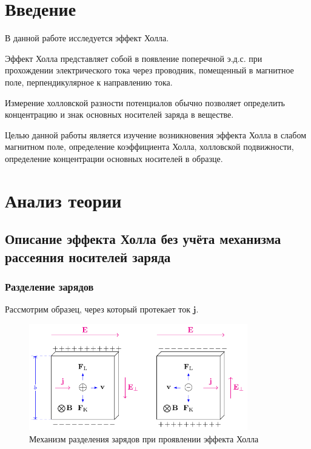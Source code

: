 
\usepackage{colortbl}


\def\labauthors{Понур К.А., Сарафанов Ф.Г., Сидоров Д.А.}
\def\labgroup{420}
\def\labnumber{204}
\def\labtheme{Эффект Холла}
\renewcommand{\vec}{\mathbf}


\tableofcontents
\newpage

\section*{Введение}
\label{sec:input}

В данной работе исследуется эффект Холла.

Эффект Холла представляет собой в появление поперечной э.д.с. при прохождении 
электрического тока через проводник, помещенный в магнитное поле, перпендикулярное к направлению тока. 

Измерение холловской разности потенциалов обычно позволяет определить концентрацию и знак основных носителей заряда в веществе.

Целью данной работы является изучение возникновения эффекта Холла в слабом магнитном поле, определение коэффициента Холла, холловской подвижности, определение концентрации основных носителей в образце.

\section{Анализ теории}
\subsection[Описание эффекта Холла]{Описание эффекта Холла без учёта механизма рассеяния носителей заряда}
\subsubsection{Разделение зарядов}
Рассмотрим образец, через который протекает ток $\vec{j}$.
\begin{figure}[H]
	\centering
	\includegraphics[width=0.85\textwidth]{img/effect}
	\caption{Механизм разделения зарядов при проявлении эффекта Холла}
	\label{fig:figure1}
\end{figure}

